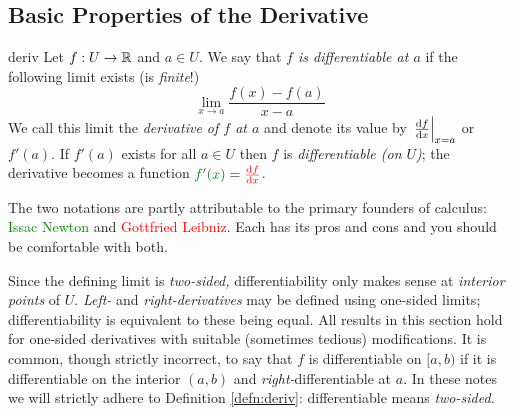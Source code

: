 \subsection{Basic Properties of the Derivative}\label{sec:derivproperties}

\begin{defn}{}{deriv}
	Let $f:U\to\R$ and $a\in U$. We say that \emph{$f$ is differentiable at $a$} if the following limit exists (is \emph{finite}!)
	\[
		\lim_{x\to a}\frac{f(x)-f(a)}{x-a}
	\]
	We call this limit the \emph{derivative of $f$ at $a$} and denote its value by $\diffat[f]{x}{x=a}$ or $f'(a)$.\smallbreak
	If $f'(a)$ exists for all $a\in U$ then $f$ is \emph{differentiable (on $U$)}; the derivative becomes a function $\textcolor{Green}{f'(x)}=\textcolor{red}{\diff[f]{x}}$.
\end{defn}

The two notations are partly attributable to the primary founders of calculus: \textcolor{Green}{Issac Newton} and \textcolor{red}{Gottfried Leibniz}. Each has its pros and cons and you should be comfortable with both.

 Since the defining limit is \emph{two-sided,} differentiability only makes sense at \emph{interior points} of $U$. \emph{Left-} and \emph{right-derivatives} may be defined using one-sided limits; differentiability is  equivalent to these being equal. All results in this section hold for one-sided derivatives with suitable (sometimes tedious) modifications. It is common, though strictly incorrect, to say that $f$ is differentiable on $[a,b)$ if it is differentiable on the interior $(a,b)$ and \emph{right-}differentiable at $a$. In these notes we will strictly adhere to Definition \ref{defn:deriv}: differentiable means \emph{two-sided.}


